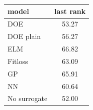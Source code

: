 \begin{tabular}{|lc|}
\hline
model & last rank\\
\hline
DOE & 53.27 \\
DOE plain & 56.27 \\
ELM & 66.82 \\
Fitloss & 63.09 \\
GP & 65.91 \\
NN & 60.64 \\
No surrogate & 52.00 \\
\hline
\end{tabular}
